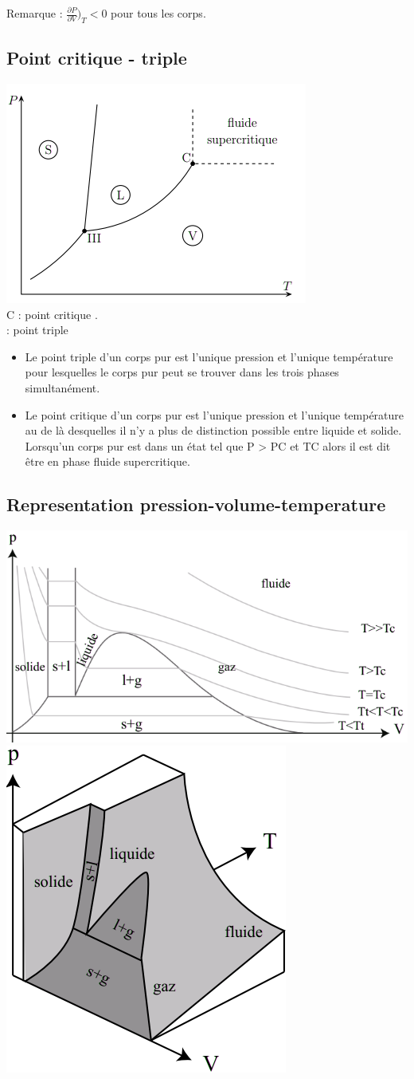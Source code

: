 \documentclass[12pt,oneside]{book}
\begin{document}
Remarque : $\frac{\partial P}{\partial V})_T < 0$ pour tous les corps.
\subsection{Point critique - triple}
\begin{center}
    \includegraphics[width=0.5\linewidth]{../pic/3300/9.png}\\
    C : point critique .\\
     : point triple
\end{center}
\begin{itemize}
    \item Le point triple d'un corps pur est l'unique pression et l'unique température pour lesquelles le corps pur peut se trouver dans les trois phases simultanément.
    \item Le point critique d'un corps pur est l'unique pression et l'unique température au de là desquelles il n'y a plus de distinction possible entre liquide et solide.\\
          Lorsqu'un corps pur est dans un état tel que P > PC et TC alors il est dit être en phase
          fluide supercritique.

\end{itemize}
\subsection{Representation pression-volume-temperature}
\begin{center}
    \includegraphics[width=0.5\linewidth]{../pic/3300/10.png}
    \includegraphics[width=0.2\linewidth]{../pic/3300/11.png}
\end{center}
\end{document}

